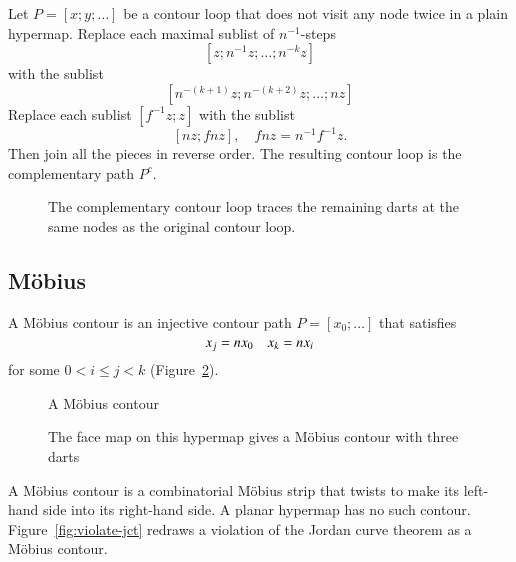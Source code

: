 \begin{definition} 
Let $P=[x;y;\ldots]$ be a contour loop that does not visit any node twice in a plain hypermap.   Replace each maximal sublist of $n^{-1}$-steps
$$
[z;n^{-1} z; \ldots; n^{-k} z]
$$
with the sublist
$$
[n^{-(k+1)} z;n^{-(k+2)} z;\ldots; n z]
$$
Replace each sublist $[f^{-1} z;z]$ with the sublist
$$
[n z; f n z],\quad f n z = n^{-1} f^{-1} z.
$$
Then join all the pieces in reverse order. The resulting contour loop is the complementary path $P^c$.
\end{definition}

\begin{figure}[htb]
  \centering
  \caption{The complementary contour loop traces the remaining darts
   at the same nodes as the original contour loop. }
  \label{fig:contour-comp}
\end{figure}

\subsection{M\"obius}

\begin{definition} A M\"obius contour is an
injective contour path $P=[x_0;\ldots]$ that satisfies
    \begin{equation}
    \tlabel{eqn:mobius}
    x_j = n x_0\quad x_k = n x_i
    \end{equation}
for some $0 < i\le j< k$ (Figure~\ref{fig:mobius}).
\end{definition}

\begin{figure}[htb]
  \centering
  \caption{A M\"obius contour}
  \label{fig:mobius}
\end{figure}

\begin{figure}[htb]
  \centering
  \caption{The face map on this hypermap gives a M\"obius contour with three darts}
  \label{fig:3m}
\end{figure}

\begin{remark} A M\"obius contour is a 
combinatorial M\"obius strip that
twists to make 
its left-hand side into
its right-hand side.  A planar hypermap has no such contour.  
Figure~\ref{fig:violate-jct}
redraws a violation of the Jordan curve theorem
as a M\"obius contour.   
\end{remark}


